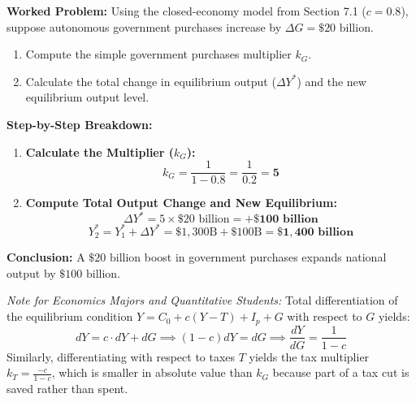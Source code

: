 \documentclass[11pt,letterpaper]{article}
\begin{document}
\noindent\textbf{Worked Problem:}
Using the closed-economy model from Section 7.1 ($c = 0.8$), suppose autonomous government purchases increase by $\Delta G = \$20\text{ billion}$.
\begin{enumerate}
    \item Compute the simple government purchases multiplier $k_G$.
    \item Calculate the total change in equilibrium output ($\Delta Y^*$) and the new equilibrium output level.
\end{enumerate}

\noindent\textbf{Step-by-Step Breakdown:}
\begin{enumerate}
    \item \textbf{Calculate the Multiplier ($k_G$):}
    \[
    k_G = \frac{1}{1 - 0.8} = \frac{1}{0.2} = \mathbf{5}
    \]

    \item \textbf{Compute Total Output Change and New Equilibrium:}
    \[
    \Delta Y^* = 5 \times \$20\text{ billion} = \mathbf{+\$100\text{ billion}}
    \]
    \[
    Y_2^* = Y_1^* + \Delta Y^* = \$1{,}300\text{B} + \$100\text{B} = \mathbf{\$1{,}400\text{ billion}}
    \]
\end{enumerate}
\textbf{Conclusion:} A $\$20\text{ billion}$ boost in government purchases expands national output by $\$100\text{ billion}$.

\begin{tcolorbox}[colback=blue!5!white,colframe=blue!75!black,title=\textbf{Optional Advanced Section: Calculus Derivation of the Multiplier}]
\small
\emph{Note for Economics Majors and Quantitative Students:}
Total differentiation of the equilibrium condition $Y = C_0 + c(Y - T) + I_p + G$ with respect to $G$ yields:
\[
dY = c \cdot dY + dG \implies (1 - c)dY = dG \implies \frac{dY}{dG} = \frac{1}{1 - c}
\]
Similarly, differentiating with respect to taxes $T$ yields the tax multiplier $k_T = \frac{-c}{1 - c}$, which is smaller in absolute value than $k_G$ because part of a tax cut is saved rather than spent.
\end{tcolorbox}
\end{document}
